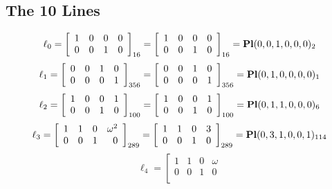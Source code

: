 \documentclass{article}
\begin{document}
{\subsection*{The 10 Lines}
$$
\ell_{0} = 
\left[
\begin{array}{*{4}{r}}
1 & 0 & 0 & 0\\
0 & 0 & 1 & 0\\
\end{array}
\right]
_{16}
=
\left[
\begin{array}{*{4}c}
1  & 0  & 0  & 0\\
0  & 0  & 1  & 0\\
\end{array}
\right]_{16}
={\rm\bf Pl}(0,0,1,0,0,0 )_{2}$$
$$
\ell_{1} = 
\left[
\begin{array}{*{4}{r}}
0 & 0 & 1 & 0\\
0 & 0 & 0 & 1\\
\end{array}
\right]
_{356}
=
\left[
\begin{array}{*{4}c}
0  & 0  & 1  & 0\\
0  & 0  & 0  & 1\\
\end{array}
\right]_{356}
={\rm\bf Pl}(0,1,0,0,0,0 )_{1}$$
$$
\ell_{2} = 
\left[
\begin{array}{*{4}{r}}
1 & 0 & 0 & 1\\
0 & 0 & 1 & 0\\
\end{array}
\right]
_{100}
=
\left[
\begin{array}{*{4}c}
1  & 0  & 0  & 1\\
0  & 0  & 1  & 0\\
\end{array}
\right]_{100}
={\rm\bf Pl}(0,1,1,0,0,0 )_{6}$$
$$
\ell_{3} = 
\left[
\begin{array}{*{4}{r}}
1 & 1 & 0 & \omega^{2}\\
0 & 0 & 1 & 0\\
\end{array}
\right]
_{289}
=
\left[
\begin{array}{*{4}c}
1  & 1  & 0  & 3\\
0  & 0  & 1  & 0\\
\end{array}
\right]_{289}
={\rm\bf Pl}(0,3,1,0,0,1 )_{114}$$
$$
\ell_{4} = 
\left[
\begin{array}{*{4}{r}}
1 & 1 & 0 & \omega \\
0 & 0 & 1 & 0\\

\end{array}$$}
\end{document}
